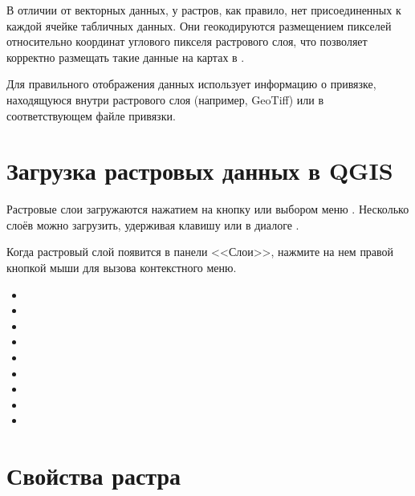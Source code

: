 В отличии от векторных данных, у растров, как правило, нет присоединенных к каждой
ячейке табличных данных. Они геокодируются размещением пикселей относительно
координат углового пикселя растрового слоя, что позволяет корректно размещать
такие данные на картах в \qg.

Для правильного отображения данных \qg использует информацию о привязке,
находящуюся внутри растрового слоя (например, GeoTiff) или в соответствующем файле
привязки.

\section{Загрузка растровых данных в QGIS}\label{label_loadraster}

Растровые слои загружаются нажатием на кнопку
 или выбором меню
 \arrow
{}.
Несколько слоёв можно загрузить, удерживая клавишу 
или  в диалоге .

Когда растровый слой появится в панели <<Слои>>, нажмите на нем правой
кнопкой мыши для вызова контекстного меню.


\begin{itemize}[label=--]
\item {}
\item {}
\item {}
\item {}
\item {}
\item {}
\item {}
\item {}
\item {}
\end{itemize}

\section{Свойства растра}\label{label_rasterprop}

